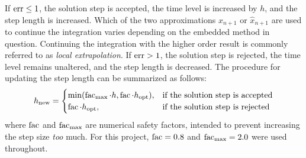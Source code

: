 If $\operatorname{err}\leq1$, the solution step is accepted, the time level is increased by
$h$, and the step length is increased. Which of the two approximations $x_{n+1}$
or $\widehat{x}_{n+1}$ are used to continue the integration varies depending on the embedded method in
question. Continuing the integration with the higher order result is commonly
referred to as \emph{local extrapolation}. If $\operatorname{err}>1$, the solution step is
rejected, the time level remains unaltered, and the step length is decreased.
The  procedure for updating the step length can be summarized as follows:
\begin{equation}
    \label{eq:embeddedstepsizeadjustment}
h_{\mathrm{new}}=\begin{cases}%
    \min(\facem_{\mathrm{max}}\cdot{}h,\facem\cdot{}h_{\mathrm{opt}}),&
\textnormal{if the solution step is accepted}\\
\facem\cdot{}h_{\mathrm{opt}},&\textnormal{if the solution step is rejected}%
\end{cases}
\end{equation}
where $\operatorname{fac}$ and $\operatorname{fac}_{\mathrm{max}}$ are numerical safety factors,
intended to prevent increasing the step size \emph{too} much. For this project,
$\operatorname{fac}=0.8$ and $\operatorname{fac}_{\mathrm{max}}=2.0$ were used throughout.
